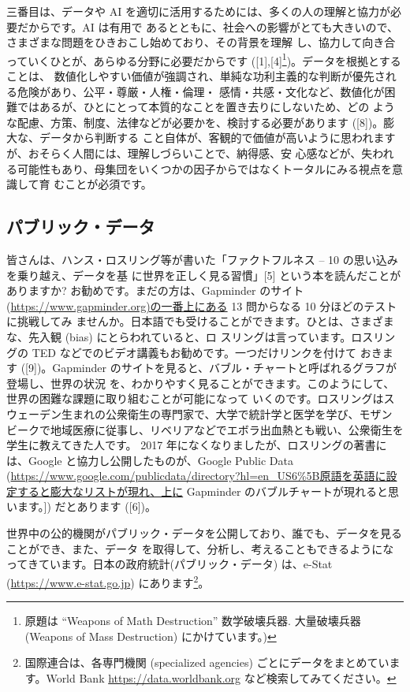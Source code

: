 \documentclass[
]{bxjsbook}
\theoremstyle{definition}
\theoremstyle{definition}
\theoremstyle{definition}
\theoremstyle{definition}
\theoremstyle{remark}
\begin{document}
三番目は、データや AI を適切に活用するためには、多くの人の理解と協力が必要だからです。AI は有用で あるとともに、社会への影響がとても大きいので、さまざまな問題をひきおこし始めており、その背景を理解 し、協力して向き合っていくひとが、あらゆる分野に必要だからです ({[}1{]},{[}4{]}\footnote{ 原題は ``Weapons of Math Destruction'' 数学破壊兵器. 大量破壊兵器 (Weapons of Mass Destruction) にかけています。)})。データを根拠とすることは、 数値化しやすい価値が強調され、単純な功利主義的な判断が優先される危険があり、公平・尊厳・人権・倫理・ 感情・共感・文化など、数値化が困難ではあるが、ひとにとって本質的なことを置き去りにしないため、どの ような配慮、方策、制度、法律などが必要かを、検討する必要があります ({[}8{]})。膨大な、データから判断する こと自体が、客観的で価値が高いように思われますが、おそらく人間には、理解しづらいことで、納得感、安 心感などが、失われる可能性もあり、母集団をいくつかの因子からではなくトータルにみる視点を意識して育 むことが必須です。

\hypertarget{ux30d1ux30d6ux30eaux30c3ux30afux30c7ux30fcux30bf}{%
\subsection{パブリック・データ}\label{ux30d1ux30d6ux30eaux30c3ux30afux30c7ux30fcux30bf}}

皆さんは、ハンス・ロスリング等が書いた「ファクトフルネス -- 10 の思い込みを乗り越え、データを基 に世界を正しく見る習慣」{[}5{]} という本を読んだことがありますか? お勧めです。まだの方は、Gapminder のサイト(\url{https://www.gapminder.org)の一番上にある} 13 問からなる 10 分ほどのテストに挑戦してみ ませんか。日本語でも受けることができます。ひとは、さまざまな、先入観 (bias) にとらわれていると、ロ スリングは言っています。ロスリングの TED などでのビデオ講義もお勧めです。一つだけリンクを付けて おきます ({[}9{]})。Gapminder のサイトを見ると、バブル・チャートと呼ばれるグラフが登場し、世界の状況 を、わかりやすく見ることができます。このようにして、世界の困難な課題に取り組むことが可能になって いくのです。ロスリングはスウェーデン生まれの公衆衛生の専門家で、大学で統計学と医学を学び、モザン ビークで地域医療に従事し、リベリアなどでエボラ出血熱とも戦い、公衆衛生を学生に教えてきた人です。 2017 年になくなりましたが、ロスリングの著書には、Google と協力し公開したものが、Google Public Data (\url{https://www.google.com/publicdata/directory?hl=en_US6\%5B原語を英語に設定すると膨大なリストが現れ、上に} Gapminder のバブルチャートが現れると思います。{]}) だとあります ({[}6{]})。

世界中の公的機関がパブリック・データを公開しており、誰でも、データを見ることができ、また、データ を取得して、分析し、考えることもできるようになってきています。日本の政府統計(パブリック・データ) は、e-Stat (\url{https://www.e-stat.go.jp}) にあります\footnote{国際連合は、各専門機関 (specialized agencies) ごとにデータをまとめています。World Bank \url{https://data.worldbank.org} など検索してみてください。}。
\end{document}
